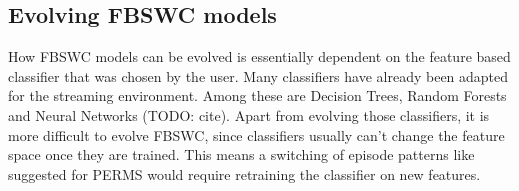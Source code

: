 \subsection{Evolving FBSWC models}
How FBSWC models can be evolved is essentially dependent on the feature based classifier that was chosen by the user. Many classifiers have already been adapted for the streaming environment. Among these are Decision Trees, Random Forests and Neural Networks (TODO: cite). Apart from evolving those classifiers, it is more difficult to evolve FBSWC, since classifiers usually can't change the feature space once they are trained. This means a switching of episode patterns like suggested for PERMS would require retraining the classifier on new features.